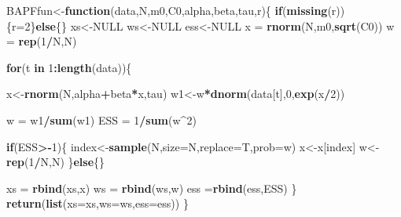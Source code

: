 \documentclass[
]{book}
\newenvironment{Shaded}{\begin{snugshade}}{\end{snugshade}}
\newcommand{\ControlFlowTok}[1]{\textcolor[rgb]{0.13,0.29,0.53}{\textbf{#1}}}
\newcommand{\DataTypeTok}[1]{\textcolor[rgb]{0.13,0.29,0.53}{#1}}
\newcommand{\DecValTok}[1]{\textcolor[rgb]{0.00,0.00,0.81}{#1}}
\newcommand{\KeywordTok}[1]{\textcolor[rgb]{0.13,0.29,0.53}{\textbf{#1}}}
\newcommand{\NormalTok}[1]{#1}
\newcommand{\OperatorTok}[1]{\textcolor[rgb]{0.81,0.36,0.00}{\textbf{#1}}}
\newcommand{\OtherTok}[1]{\textcolor[rgb]{0.56,0.35,0.01}{#1}}
\newcommand{\StringTok}[1]{\textcolor[rgb]{0.31,0.60,0.02}{#1}}
\theoremstyle{break}
\theoremstyle{nonumberplain}
\begin{document}
\begin{Shaded}
\begin{Highlighting}[]
\NormalTok{BAPFfun<-}\ControlFlowTok{function}\NormalTok{(data,N,m0,C0,alpha,beta,tau,r)\{}
  \ControlFlowTok{if}\NormalTok{(}\KeywordTok{missing}\NormalTok{(r))\{r=}\DecValTok{2}\NormalTok{\}}\ControlFlowTok{else}\NormalTok{\{\}}
\NormalTok{  xs<-}\OtherTok{NULL}
\NormalTok{  ws<-}\OtherTok{NULL}
\NormalTok{  ess<-}\OtherTok{NULL}
\NormalTok{  x  =}\StringTok{ }\KeywordTok{rnorm}\NormalTok{(N,m0,}\KeywordTok{sqrt}\NormalTok{(C0))}
\NormalTok{  w  =}\StringTok{ }\KeywordTok{rep}\NormalTok{(}\DecValTok{1}\OperatorTok{/}\NormalTok{N,N)}
  
  \ControlFlowTok{for}\NormalTok{(t }\ControlFlowTok{in} \DecValTok{1}\OperatorTok{:}\KeywordTok{length}\NormalTok{(data))\{}
    
\NormalTok{    x<-}\KeywordTok{rnorm}\NormalTok{(N,alpha}\OperatorTok{+}\NormalTok{beta}\OperatorTok{*}\NormalTok{x,tau)}
\NormalTok{    w1<-w}\OperatorTok{*}\KeywordTok{dnorm}\NormalTok{(data[t],}\DecValTok{0}\NormalTok{,}\KeywordTok{exp}\NormalTok{(x}\OperatorTok{/}\DecValTok{2}\NormalTok{))}
    
\NormalTok{    w =}\StringTok{ }\NormalTok{w1}\OperatorTok{/}\KeywordTok{sum}\NormalTok{(w1)}
\NormalTok{    ESS  =}\StringTok{ }\DecValTok{1}\OperatorTok{/}\KeywordTok{sum}\NormalTok{(w}\OperatorTok{^}\DecValTok{2}\NormalTok{)}
    
    \ControlFlowTok{if}\NormalTok{(ESS}\OperatorTok{>-}\DecValTok{1}\NormalTok{)\{}
\NormalTok{      index<-}\KeywordTok{sample}\NormalTok{(N,}\DataTypeTok{size=}\NormalTok{N,}\DataTypeTok{replace=}\NormalTok{T,}\DataTypeTok{prob=}\NormalTok{w)}
\NormalTok{      x<-x[index]}
\NormalTok{      w<-}\KeywordTok{rep}\NormalTok{(}\DecValTok{1}\OperatorTok{/}\NormalTok{N,N)}
\NormalTok{    \}}\ControlFlowTok{else}\NormalTok{\{\}}
    
\NormalTok{    xs =}\StringTok{ }\KeywordTok{rbind}\NormalTok{(xs,x)}
\NormalTok{    ws =}\StringTok{ }\KeywordTok{rbind}\NormalTok{(ws,w)}
\NormalTok{    ess =}\KeywordTok{rbind}\NormalTok{(ess,ESS)}
\NormalTok{  \}}
  \KeywordTok{return}\NormalTok{(}\KeywordTok{list}\NormalTok{(}\DataTypeTok{xs=}\NormalTok{xs,}\DataTypeTok{ws=}\NormalTok{ws,}\DataTypeTok{ess=}\NormalTok{ess))}
\NormalTok{\}}
\end{Highlighting}
\end{Shaded}

\backmatter
\end{document}
